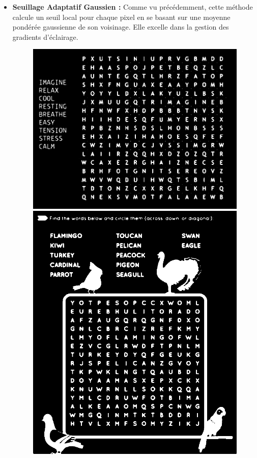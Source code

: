 \documentclass{article}
\begin{document}
\begin{itemize}
    \item \textbf{Seuillage Adaptatif Gaussien :} Comme vu précédemment, cette méthode calcule un seuil local pour chaque pixel en se basant sur une moyenne pondérée gaussienne de son voisinage. Elle excelle dans la gestion des gradients d'éclairage.
    \begin{figure}[H]
      \centering
          \includegraphics[width=\linewidth]{ressources/1level_1_image_1_04_adaptive_threshold.png}
          \caption{}
        \endminipage\quad\quad\quad\quad
        \includegraphics[width=\linewidth]{ressources/3level_3_image_2_04_adaptive_threshold.png}

\end{figure}
\end{itemize}
\end{document}
